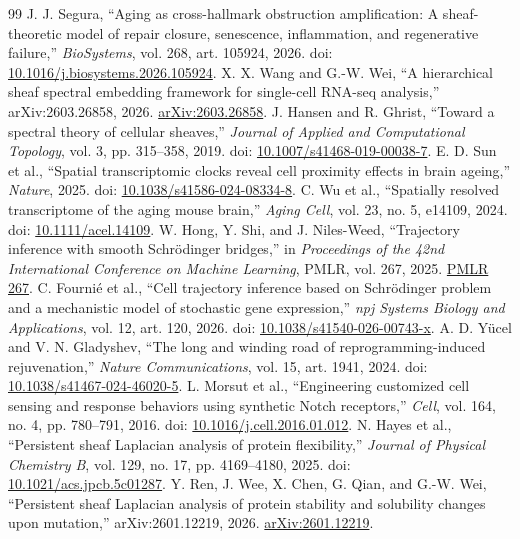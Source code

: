 \documentclass[11pt]{article}
\begin{document}
\begin{thebibliography}{99}\small\setlength{\itemsep}{0pt}
 J. J. Segura, ``Aging as cross-hallmark obstruction amplification: A sheaf-theoretic model of repair closure, senescence, inflammation, and regenerative failure,'' \emph{BioSystems}, vol. 268, art. 105924, 2026. doi: \href{https://doi.org/10.1016/j.biosystems.2026.105924}{10.1016/j.biosystems.2026.105924}.
 X. X. Wang and G.-W. Wei, ``A hierarchical sheaf spectral embedding framework for single-cell RNA-seq analysis,'' arXiv:2603.26858, 2026. \href{https://arxiv.org/abs/2603.26858}{arXiv:2603.26858}.
 J. Hansen and R. Ghrist, ``Toward a spectral theory of cellular sheaves,'' \emph{Journal of Applied and Computational Topology}, vol. 3, pp. 315--358, 2019. doi: \href{https://doi.org/10.1007/s41468-019-00038-7}{10.1007/s41468-019-00038-7}.
 E. D. Sun et al., ``Spatial transcriptomic clocks reveal cell proximity effects in brain ageing,'' \emph{Nature}, 2025. doi: \href{https://doi.org/10.1038/s41586-024-08334-8}{10.1038/s41586-024-08334-8}.
 C. Wu et al., ``Spatially resolved transcriptome of the aging mouse brain,'' \emph{Aging Cell}, vol. 23, no. 5, e14109, 2024. doi: \href{https://doi.org/10.1111/acel.14109}{10.1111/acel.14109}.
 W. Hong, Y. Shi, and J. Niles-Weed, ``Trajectory inference with smooth Schr\"odinger bridges,'' in \emph{Proceedings of the 42nd International Conference on Machine Learning}, PMLR, vol. 267, 2025. \href{https://proceedings.mlr.press/v267/hong25f.html}{PMLR 267}.
 C. Fourni\'e et al., ``Cell trajectory inference based on Schr\"odinger problem and a mechanistic model of stochastic gene expression,'' \emph{npj Systems Biology and Applications}, vol. 12, art. 120, 2026. doi: \href{https://doi.org/10.1038/s41540-026-00743-x}{10.1038/s41540-026-00743-x}.
 A. D. Y\"ucel and V. N. Gladyshev, ``The long and winding road of reprogramming-induced rejuvenation,'' \emph{Nature Communications}, vol. 15, art. 1941, 2024. doi: \href{https://doi.org/10.1038/s41467-024-46020-5}{10.1038/s41467-024-46020-5}.
 L. Morsut et al., ``Engineering customized cell sensing and response behaviors using synthetic Notch receptors,'' \emph{Cell}, vol. 164, no. 4, pp. 780--791, 2016. doi: \href{https://doi.org/10.1016/j.cell.2016.01.012}{10.1016/j.cell.2016.01.012}.
 N. Hayes et al., ``Persistent sheaf Laplacian analysis of protein flexibility,'' \emph{Journal of Physical Chemistry B}, vol. 129, no. 17, pp. 4169--4180, 2025. doi: \href{https://doi.org/10.1021/acs.jpcb.5c01287}{10.1021/acs.jpcb.5c01287}.
 Y. Ren, J. Wee, X. Chen, G. Qian, and G.-W. Wei, ``Persistent sheaf Laplacian analysis of protein stability and solubility changes upon mutation,'' arXiv:2601.12219, 2026. \href{https://arxiv.org/abs/2601.12219}{arXiv:2601.12219}.
\end{thebibliography}
\end{document}
